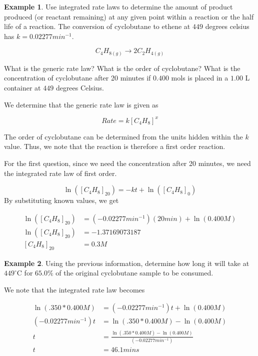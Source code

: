 \documentclass[11pt]{article}
\theoremstyle{plain} %
\theoremstyle{definition}
\theoremstyle{example}
\newtheorem*{example}{Example}
\theoremstyle{remark}
\begin{document}
\begin{example}
Use integrated rate laws to determine the amount of product produced (or reactant remaining) at any given point within a reaction or the half life of a reaction. The conversion of cyclobutane to ethene at $449$ degrees celsius has $k=0.02277 min^{-1} $.

$$C_4H_{8(g)} \rightarrow 2C_2H_{4(g)}$$

What is the generic rate law? What is the order of cyclobutane? What is the concentration of cyclobutane after 20 minutes if $0.400$ mols is placed in a $1.00$ L container at $449$ degrees Celsius. 

\end{example}

We determine that the generic rate law is given as 

$$ Rate = k[C_4H_8]^x$$

The order of cyclobutane can be determined from the units hidden within the $k$ value. Thus, we note that the reaction is therefore a first order reaction. 

For the first question, since we need the concentration after 20 minutes, we need the integrated rate law of first order. 

$$\ln\left([C_4H_8]_{20}\right) = -kt + \ln\left([C_4H_8]_0\right)$$
By substituting known values, we get

\begin{align*}
\ln\left([C_4H_8]_{20}\right) &= \left(-0.02277min^{-1}\right)(20 min) + \ln\left(0.400 M\right)\\
\ln\left([C_4H_8]_{20}\right) &=-1.37169073187\\
[C_4H_8]_{20}&= 0.3M
\end{align*}


\begin{example}
Using the previous information, determine how long it will take at $449^{\circ}\mathrm C$ for $65.0\%$ of the original cyclobutane sample to be consumed.
\end{example}

We note that the integrated rate law becomes

\begin{align*}
\ln\left(.350*0.400M\right) &= \left(-0.02277min^{-1}\right)t + \ln\left(0.400 M\right)\\
 \left(-0.02277min^{-1}\right)t &= \ln\left(.350*0.400M\right)- \ln\left(0.400 M\right)\\
 t &= \frac{\ln\left(.350*0.400M\right)- \ln\left(0.400 M\right)}{\left(-0.02277min^{-1}\right)}\\
 t &= 46.1 mins
\end{align*}
\end{document}

